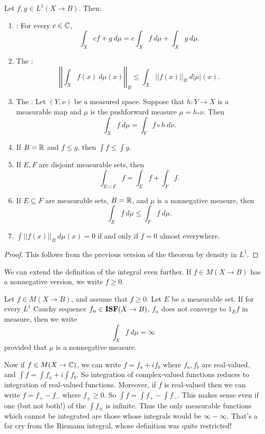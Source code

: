 \begin{theorem}
Let $f,g \in L^1(X \to B)$. Then:
\begin{enumerate}
\item {}: For every $c \in \mathbb{C}$,
\[\int_{X} cf + g~d\mu = c\int_{X} f ~d\mu + \int_{X} g~d\mu.\]
\item The :
\[\left|\left|\int_{X} f(x) ~d\mu(x)\right|\right|_{B} \leq \int_{X} ||f(x)||_B~d|\mu|(x).\]
\item The : Let $(Y, \nu)$ be a measured space. Suppose that $h: Y \to X$ is a measurable map and $\mu$ is the pushforward measure $\mu = h_*\nu$. Then
\[\int_{X} f~d\mu = \int_{Y} f \circ h~d\nu.\]
\item If $B = \mathbb{R}$ and $f \leq g$, then $\int f \leq \int g$.
\item If $E,F$ are disjoint measurable sets, then
\[\int_{E \cup F} f = \int_{E} f + \int_{F} f.\]
\item If $E \subseteq F$ are measurable sets, $B = \mathbb{R}$, and $\mu$ is a nonnegative measure, then
\[\int_{E} f~d\mu \leq \int_{F} f~d\mu.\]
\item $\int ||f(x)||_{B} ~d\mu(x) = 0$ if and only if $f = 0$ almost everywhere.
\end{enumerate}
\end{theorem}
\begin{proof}
This follows from the previous version of the theorem by density in $L^1$.
\end{proof}

\begin{subsec}
We can extend the definition of the integral even further.
If $f \in M(X \to B)$ has a nonnegative version, we write $f \geq 0$.
\end{subsec}

\begin{definition}
Let $f \in M(X \to B)$, and assume that $f \geq 0$. Let $E$ be a measurable set. If for every $L^1$ Cauchy sequence $f_{n} \in \mathbf{ISF}(X \to B)$, $f_{n}$ does not converge to $1_{E} f$ in measure, then we write
\[\int_{X} f ~d\mu = \infty\]
provided that $\mu$ is a nonnegative measure.
\end{definition}

\begin{subsec}
Now if $f \in M(X \to \mathbb{C})$, we can write $f = f_{a} + if_{b}$ where $f_{a}, f_{b}$ are real-valued, and $\int f = \int f_{a} + i\int f_{b}$.
So integration of complex-valued functions reduces to integration of real-valued functions. Moreover, if $f$ is real-valued then we can write $f = f_+ - f_-$ where $f_{\pm} \geq 0$. So $\int f = \int f_+ - \int f_-$.
This makes sense even if one (but not both!) of the $\int f_\pm$ is infinite.
Thus the only measurable functions which cannot be integrated are those whose integrals would be $\infty - \infty$.
That's a far cry from the Riemann integral, whose definition was quite restricted!
\end{subsec}

